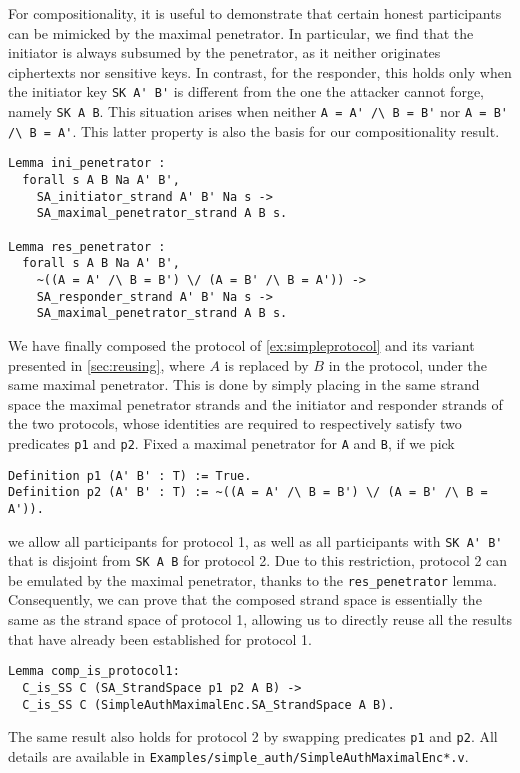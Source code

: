 For compositionality, it is useful to demonstrate that certain honest participants can be mimicked by the maximal penetrator.
In particular, we find that the initiator is always subsumed by the penetrator, as it neither originates ciphertexts nor sensitive keys.
In contrast, for the responder, this holds only when the initiator key \lstinline|SK A' B'| is different from the one the attacker cannot forge, namely \lstinline|SK A B|.
This situation arises when neither \lstinline|A = A' /\ B = B'| nor \lstinline|A = B' /\ B = A'|.
This latter property is also the basis for our compositionality result.
\begin{lstlisting}
Lemma ini_penetrator :
  forall s A B Na A' B',
    SA_initiator_strand A' B' Na s ->
    SA_maximal_penetrator_strand A B s.

Lemma res_penetrator :
  forall s A B Na A' B',
    ~((A = A' /\ B = B') \/ (A = B' /\ B = A')) ->
    SA_responder_strand A' B' Na s ->
    SA_maximal_penetrator_strand A B s.
\end{lstlisting}
We have finally composed the protocol of \cref{ex:simpleprotocol} and its variant presented in \cref{sec:reusing}, where $A$ is replaced by $B$ in the protocol, under the same maximal penetrator.
This is done by simply placing in the same strand space the maximal penetrator strands and the initiator and responder strands of the two protocols, whose identities are required to respectively satisfy two predicates \lstinline|p1| and \lstinline|p2|.
Fixed a maximal penetrator for \lstinline|A| and \lstinline|B|, if we pick
\begin{lstlisting}
Definition p1 (A' B' : T) := True.
Definition p2 (A' B' : T) := ~((A = A' /\ B = B') \/ (A = B' /\ B = A')).
\end{lstlisting}
we allow all participants for protocol 1, as well as all participants with \lstinline|SK A' B'| that is disjoint from \lstinline|SK A B| for protocol 2.
Due to this restriction, protocol 2 can be emulated by the maximal penetrator, thanks to the \lstinline|res_penetrator| lemma.
Consequently, we can prove that the composed strand space is essentially the same as the strand space of protocol 1, allowing us to directly reuse all the results that have already been established for protocol 1.
\begin{lstlisting}
Lemma comp_is_protocol1:
  C_is_SS C (SA_StrandSpace p1 p2 A B) ->
  C_is_SS C (SimpleAuthMaximalEnc.SA_StrandSpace A B).
\end{lstlisting}
The same result also holds for protocol 2 by swapping predicates \lstinline|p1| and \lstinline|p2|.
All details are available in \lstinline{Examples/simple_auth/SimpleAuthMaximalEnc*.v}.





